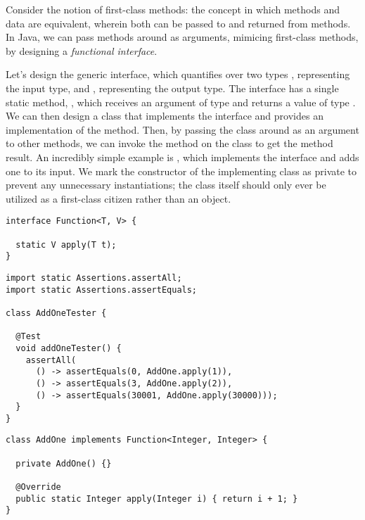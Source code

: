 Consider the notion of first-class methods: the concept in which methods and data are equivalent, wherein both can be passed to and returned from methods. In Java, we can pass methods around as arguments, mimicing first-class methods, by designing a \emph{functional interface}.

Let's design the generic  interface, which quantifies over two types , representing the input type, and , representing the output type. 
The  interface has a single static method, , which receives an argument of type  and returns a value of type . 
We can then design a class that implements the  interface and provides an implementation of the  method. 
Then, by passing the class around as an argument to other methods, we can invoke the  method on the class to get the method result.
An incredibly simple example is , which implements the  interface and adds one to its input. 
We mark the constructor of the implementing class as private to prevent any unnecessary instantiations; the class itself should only ever be utilized as a first-class citizen rather than an object.

\begin{lstlisting}[language=MyJava]
interface Function<T, V> {

  static V apply(T t); 
}
\end{lstlisting}

\begin{lstlisting}[language=MyJava]
import static Assertions.assertAll;
import static Assertions.assertEquals;

class AddOneTester {

  @Test
  void addOneTester() {
    assertAll(
      () -> assertEquals(0, AddOne.apply(1)),
      () -> assertEquals(3, AddOne.apply(2)),
      () -> assertEquals(30001, AddOne.apply(30000)));
  }
}
\end{lstlisting}
\begin{lstlisting}[language=MyJava]
class AddOne implements Function<Integer, Integer> {

  private AddOne() {}

  @Override
  public static Integer apply(Integer i) { return i + 1; }
}
\end{lstlisting}


